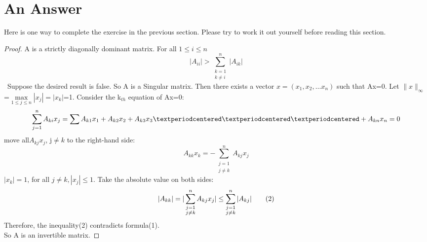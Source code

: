 \documentclass[12pt,a4paper]{article}  %
\theoremstyle{definition}
\numberwithin{equation}{section}
\begin{document}
\section{An Answer}
Here is one way to complete the exercise in the previous section. Please try to work it out yourself before reading this section.\\ 
\begin{proof}
	A is a strictly diagonally dominant matrix. For all \(1\leq i\leq n\)\[
	\vert A_{ii}\vert>\sum_{\substack {k=1 \\ k\neq i}}^{n}\vert A_{ik}\vert\tag{1}
	\]\
	Suppose the desired result is false. So A is a Singular matrix. Then there exists a vector \(x=(x_1, x_2, \dots x_n)\) such that Ax=0. Let $\lVert x \rVert_\infty$ =\(\underset{1\leq j\leq n}\max |x_j|=|x_k|\)=1. Consider the k\(_{th}\) equation of Ax=0:\\
	\[
	\sum_{j=1}^{n}A_{ki}x_j=\sum A_{k1}x_1+A_{k2}x_2+A_{k3}x_3···+A_{kn}x_n=0\\
	\]
	move all\(A_{kj}x_j\), j$\neq k$ to the right-hand side:
	\[
	A_{kk}x_k=-\sum_{\substack {j=1 \\ j\neq k}}^nA_{kj}x_j
	\]
	$|x_k|=1$, for all $ j\neq k, |x_j|\leq 1$. Take the absolute value on both sides:
	\[
	\vert A_{kk}\vert=\vert\sum_{\substack {j=1 \\ j\neq k}}^nA_{kj}x_j\vert\leq\sum_{\substack {j=1 \\ j\neq k}}^n|A_{kj}|\tag{2}
	\\
	\]
	Therefore, the inequality(2) contradicts formula(1).\\
	So A is an invertible matrix.
\end{proof}
\end{document}
